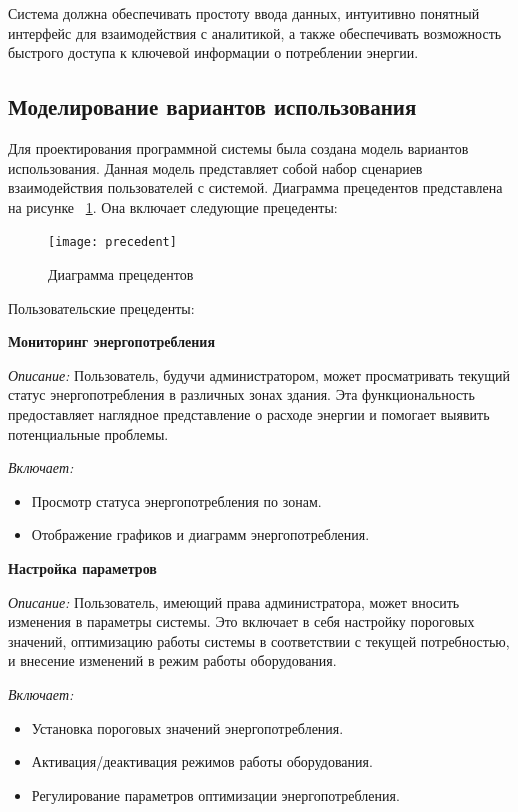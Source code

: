 Система должна обеспечивать простоту ввода данных, интуитивно понятный интерфейс для взаимодействия с аналитикой, а также обеспечивать возможность быстрого доступа к ключевой информации о потреблении энергии.



\subsection{Моделирование вариантов использования}

Для проектирования программной системы была создана модель вариантов использования. Данная модель представляет собой набор сценариев взаимодействия пользователей с системой. Диаграмма прецедентов представлена на рисунке ~\ref{precedent:image}. Она включает следующие прецеденты:

\begin{figure}[ht]
	\texttt{[image: precedent]}
	\caption{Диаграмма прецедентов}
	\label{precedent:image}
\end{figure}

{Пользовательские прецеденты:}

{\textbf{Мониторинг энергопотребления}}

\textit{Описание:} Пользователь, будучи администратором, может просматривать текущий статус энергопотребления в различных зонах здания. Эта функциональность предоставляет наглядное представление о расходе энергии и помогает выявить потенциальные проблемы.

\textit{Включает:} 
\begin{itemize}
	\item Просмотр статуса энергопотребления по зонам.
	\item Отображение графиков и диаграмм энергопотребления.
\end{itemize}

{\textbf{Настройка параметров}}

\textit{Описание:} Пользователь, имеющий права администратора, может вносить изменения в параметры системы. Это включает в себя настройку пороговых значений, оптимизацию работы системы в соответствии с текущей потребностью, и внесение изменений в режим работы оборудования.

\textit{Включает:} 
\begin{itemize}
	\item Установка пороговых значений энергопотребления.
	\item Активация/деактивация режимов работы оборудования.
	\item Регулирование параметров оптимизации энергопотребления.
\end{itemize}

